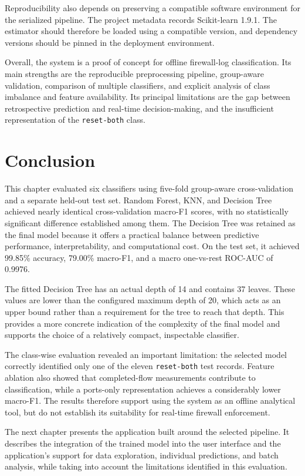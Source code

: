 Reproducibility also depends on preserving a compatible software environment for the serialized pipeline. The project metadata records Scikit-learn 1.9.1. The estimator should therefore be loaded using a compatible version, and dependency versions should be pinned in the deployment environment.

Overall, the system is a proof of concept for offline firewall-log classification. Its main strengths are the reproducible preprocessing pipeline, group-aware validation, comparison of multiple classifiers, and explicit analysis of class imbalance and feature availability. Its principal limitations are the gap between retrospective prediction and real-time decision-making, and the insufficient representation of the \texttt{reset-both} class.

\section{Conclusion}\label{sec:results-conclusion}

This chapter evaluated six classifiers using five-fold group-aware cross-validation and a separate held-out test set. Random Forest, KNN, and Decision Tree achieved nearly identical cross-validation macro-F1 scores, with no statistically significant difference established among them. The Decision Tree was retained as the final model because it offers a practical balance between predictive performance, interpretability, and computational cost. On the test set, it achieved 99.85\% accuracy, 79.00\% macro-F1, and a macro one-vs-rest ROC-AUC of 0.9976.

The fitted Decision Tree has an actual depth of 14 and contains 37 leaves. These values are lower than the configured maximum depth of 20, which acts as an upper bound rather than a requirement for the tree to reach that depth. This provides a more concrete indication of the complexity of the final model and supports the choice of a relatively compact, inspectable classifier.

The class-wise evaluation revealed an important limitation: the selected model correctly identified only one of the eleven \texttt{reset-both} test records. Feature ablation also showed that completed-flow measurements contribute to classification, while a ports-only representation achieves a considerably lower macro-F1. The results therefore support using the system as an offline analytical tool, but do not establish its suitability for real-time firewall enforcement.

The next chapter presents the application built around the selected pipeline. It describes the integration of the trained model into the user interface and the application's support for data exploration, individual predictions, and batch analysis, while taking into account the limitations identified in this evaluation.